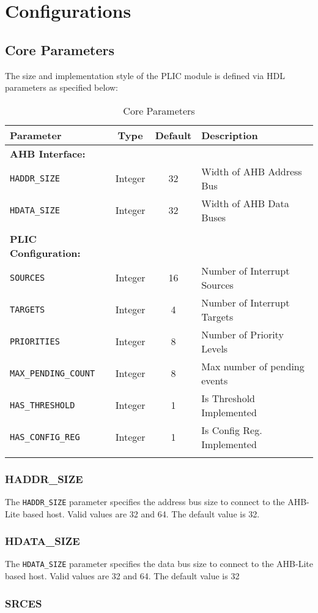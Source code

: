 \section{Configurations}

\subsection{Core Parameters}

The size and implementation style of the PLIC module is defined via HDL
parameters as specified below:

\begin{longtable}[]{@{}lccl@{}}
\toprule
\textbf{Parameter} & \textbf{Type} & \textbf{Default} & \textbf{Description}\tabularnewline
\midrule
\endhead
\textbf{AHB Interface:} & & &\tabularnewline
\texttt{HADDR\_SIZE} & Integer & 32 & Width of AHB Address Bus\tabularnewline
\texttt{HDATA\_SIZE} & Integer & 32 & Width of AHB Data Buses\tabularnewline
& & &\tabularnewline
\textbf{PLIC Configuration:} & & &\tabularnewline
\texttt{SOURCES} & Integer & 16 & Number of Interrupt Sources\tabularnewline
\texttt{TARGETS} & Integer & 4 & Number of Interrupt Targets\tabularnewline
\texttt{PRIORITIES} & Integer & 8 & Number of Priority Levels\tabularnewline
\texttt{MAX\_PENDING\_COUNT} & Integer & 8 & Max number of pending events\tabularnewline
\texttt{HAS\_THRESHOLD} & Integer & 1 & Is Threshold Implemented\tabularnewline
\texttt{HAS\_CONFIG\_REG} & Integer & 1 & Is Config Reg. Implemented\tabularnewline
\bottomrule
\caption{Core Parameters}
\label{tab:CoreParams}
\end{longtable}


\subsubsection{HADDR\_SIZE}

The \texttt{HADDR\_SIZE} parameter specifies the address bus size to
connect to the AHB-Lite based host. Valid values are 32 and 64. The
default value is 32.

\subsubsection{HDATA\_SIZE}

The \texttt{HDATA\_SIZE} parameter specifies the data bus size to
connect to the AHB-Lite based host. Valid values are 32 and 64. The
default value is 32

\hypertarget{SOURCES}{\subsubsection{SRCES}\label{sec:SOURCES}}

